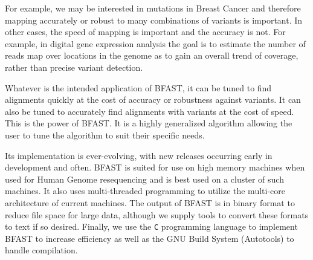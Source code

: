 \documentclass[a4paper,12pt]{book}
\newcommand{\TT}[1]{{\tt #1}} %
\begin{document}
For example, we may be interested in mutations in Breast Cancer and therefore mapping accurately or robust to many combinations of variants is important.
In other cases, the speed of mapping is important and the accuracy is not. 
For example, in digital gene expression analysis the goal is to estimate the number of reads map over locations in the genome as to gain an overall trend of coverage, rather than precise variant detection.

Whatever is the intended application of BFAST, it can be tuned to find alignments quickly at the cost of accuracy or robustness against variants.
It can also be tuned to accurately find alignments with variants at the cost of speed. 
This is the power of BFAST.
It is a highly generalized algorithm allowing the user to tune the algorithm to suit their specific needs.

Its implementation is ever-evolving, with new releases occurring early in development and often. 
BFAST is suited for use on high memory machines when used for Human Genome resequencing and is best used on a cluster of such machines.
It also uses multi-threaded programming to utilize the multi-core architecture of current machines.
The output of BFAST is in binary format to reduce file space for large data, although we supply tools to convert these formats to text if so desired.
Finally, we use the \TT{C} programming language to implement BFAST to increase efficiency as well as the GNU Build System (Autotools) to handle compilation.
\end{document}
